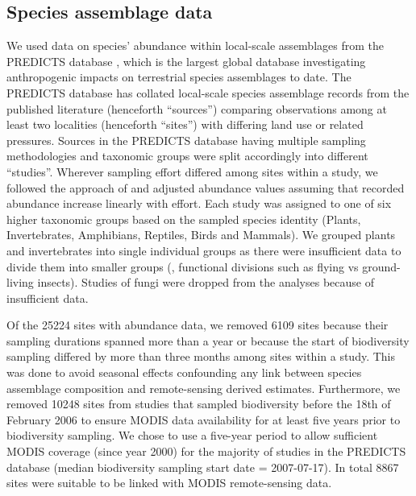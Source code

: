 \subsection{Species assemblage data}
We used data on species’ abundance within local-scale assemblages from the PREDICTS database \citep[downloaded on 3 February 2016, see \ref{SI02_01}]{Hudson2016}, which is the largest global database investigating anthropogenic impacts on terrestrial species assemblages to date. The PREDICTS database has collated local-scale species assemblage records from the published literature (henceforth “sources”) comparing observations among at least two localities (henceforth “sites”) with differing land use or related pressures. Sources in the PREDICTS database having multiple sampling methodologies and taxonomic groups were split accordingly into different “studies”. Wherever sampling effort differed among sites within a study, we followed the approach of \cite{Newbold2014b} and adjusted abundance values assuming that recorded abundance increase linearly with effort. Each study was assigned to one of six higher taxonomic groups based on the sampled species identity (Plants, Invertebrates, Amphibians, Reptiles, Birds and Mammals). We grouped plants and invertebrates into single individual groups as there were insufficient data to divide them into smaller groups (\eg, functional divisions such as flying vs ground-living insects). Studies of fungi were dropped from the analyses because of insufficient data.

Of the 25224 sites with abundance data, we removed 6109 sites because their sampling durations spanned more than a year or because the start of biodiversity sampling differed by more than three months among sites within a study. This was done to avoid seasonal effects confounding any link between species assemblage composition and remote-sensing derived estimates. Furthermore, we removed 10248 sites from studies that sampled biodiversity before the 18th of February 2006 to ensure MODIS data availability for at least five years prior to biodiversity sampling. We chose to use a five-year period to allow sufficient MODIS coverage (since year 2000) for the majority of studies in the PREDICTS database (median biodiversity sampling start date = 2007-07-17). In total 8867 sites were suitable to be linked with MODIS remote-sensing data.

